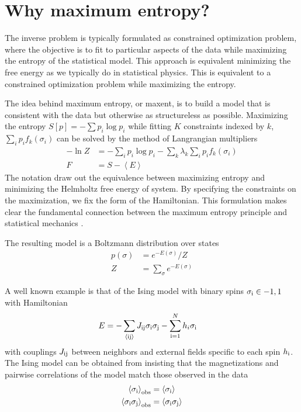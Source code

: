 \documentclass[11pt]{amsart}
\newcommand{\br}[1]{\left<#1\right>}
\newcommand{\si}[0]{\sigma_{\rm i}}
\newcommand{\sj}[0]{\sigma_{\rm j}}
\begin{document}
\section{Why maximum entropy?}
The inverse problem is typically formulated as constrained optimization problem, where the objective is to fit to particular aspects of the data while maximizing the entropy of the statistical model. This approach is equivalent minimizing the free energy as we typically do in statistical physics. This is equivalent to a constrained optimization problem while maximizing the entropy.

The idea behind maximum entropy, or maxent, is to build a model that is consistent with the data but otherwise as structureless as possible. Maximizing the entropy $S[p] = -\sum p_i \log p_i$ while fitting $K$ constraints indexed by $k$, $\sum_i p_i f_k(\sigma_i)$ can be solved by the method of Langrangian multipliers
\begin{align}
	-\ln Z &= -\sum_i p_i\log p_i - \sum_k \lambda_k \sum_i p_i f_k(\sigma_i)\\
	F &= S - \br{E}
\end{align}
The notation draw out the equivalence between maximizing entropy and minimizing the Helmholtz free energy of system. By specifying the constraints on the maximization, we fix the form of the Hamiltonian. This formulation makes clear the fundamental connection between the maximum entropy principle and statistical mechanics \cite{Jaynes}.

The resulting model is a Boltzmann distribution over states
\begin{align}
	p(\sigma) &= e^{-E(\sigma)}/Z\\
	Z &= \sum_\sigma e^{-E(\sigma)}
\end{align}

A well known example is that of the Ising model with binary spins $\sigma_{\rm i} \in {-1,1}$ with Hamiltonian 
\begin{align}
	E &= -\sum_{\br{\rm ij}} J_{\rm ij}\si\sj -\sum_{\rm i=1}^N h_i\si
\end{align}
with couplings $J_{\rm ij}$ between neighbors and external fields specific to each spin $h_{\rm i}$. The Ising model can be obtained from insisting that the magnetizations and pairwise correlations of the model match those observed in the data
\begin{align}
	\br{\si}_{\rm obs} &= \br{\si}\\
	\br{\si\sj}_{\rm obs} &= \br{\si\sj}
\end{align}
\end{document}
